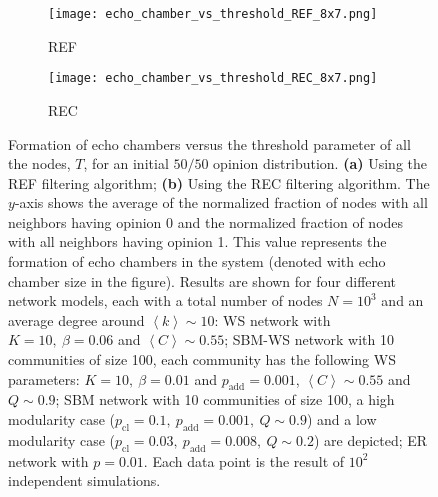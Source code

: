 \documentclass[11 pt , letterpaper , twoside , openright]{book}
\begin{document}
\begin{figure}[H]
  \begin{subfigure}[b]{0.49\textwidth}
  	\texttt{[image: echo\_chamber\_vs\_threshold\_REF\_8x7.png]}
    \caption{REF}
    \label{REF_thres}
  \end{subfigure}
  \begin{subfigure}[b]{0.49\textwidth}
  	\texttt{[image: echo\_chamber\_vs\_threshold\_REC\_8x7.png]}
    \caption{REC}
    \label{REC_thres}
  \end{subfigure}
  \captionsetup{format=plain}
  \caption[Formation of echo chambers versus the threshold parameter of all the nodes, $T$, for the REF and REC filtering algorithms and an initial $50/50$ opinion distribution.]{Formation of echo chambers versus the threshold parameter of all the nodes, $T$, for an initial $50/50$ opinion distribution. \textbf{(a)} Using the REF filtering algorithm; \textbf{(b)} Using the REC filtering algorithm. The $y$-axis shows the average of the normalized fraction of nodes with all neighbors having opinion 0 and the normalized fraction of nodes with all neighbors having opinion 1. This value represents the formation of echo chambers in the system (denoted with echo chamber size in the figure). Results are shown for four different network models, each with a total number of nodes $N=10^3$ and an average degree around $\left<k\right> \sim 10$: WS network with $K =10,\ \beta = 0.06$ and $\left<C\right> \sim 0.55$; SBM-WS network with 10 communities of size 100, each community has the following WS parameters: $K = 10,\ \beta = 0.01$ and $p_{\text{add}} = 0.001$, $\left<C\right> \sim 0.55$ and $Q \sim 0.9$; SBM network with 10 communities of size 100, a high modularity case ($p_{\text{cl}} = 0.1,\ p_{\text{add}} = 0.001,\ Q \sim 0.9$) and a low modularity case ($p_{\text{cl}} = 0.03,\ p_{\text{add}} = 0.008,\ Q \sim 0.2$) are depicted; ER network with $p= 0.01$. Each data point is the result of $10^2$ independent simulations.}
\label{echo_vs_threshold_REF-REC}
\end{figure}
\end{document}
